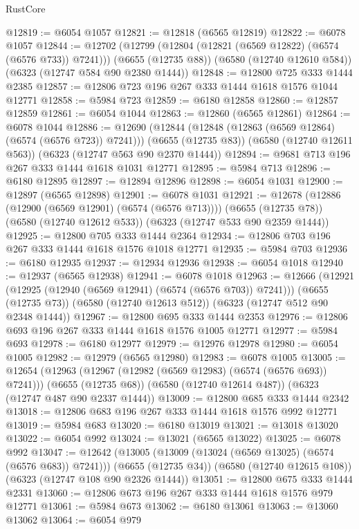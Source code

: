 \begin{lexlean}{RustCore}
\begin{coremodule}
{\begin{coremodule}
{{{{{{{{{{{{{{{{{{{{{{{{{{{{{{{{{{{{{{{{{{{{{@12819 := @6054 @1057
@12821 := @12818 (@6565 @12819)
@12822 := @6078 @1057
@12844 := @12702
    (@12799 (@12804 (@12821 (@6569 @12822) (@6574 (@6576 @733)) @7241)))
    (@6655 (@12735 @88))
    (@6580 (@12740 @12610 @584))
    (@6323 (@12747 @584 @90 @2380 @1444))
@12848 := @12800 @725 @333 @1444 @2385
@12857 := @12806 @723 @196 @267 @333 @1444 @1618 @1576 @1044 @12771
@12858 := @5984 @723
@12859 := @6180 @12858
@12860 := @12857 @12859
@12861 := @6054 @1044
@12863 := @12860 (@6565 @12861)
@12864 := @6078 @1044
@12886 := @12690
    (@12844 (@12848 (@12863 (@6569 @12864) (@6574 (@6576 @723)) @7241)))
    (@6655 (@12735 @83))
    (@6580 (@12740 @12611 @563))
    (@6323 (@12747 @563 @90 @2370 @1444))
@12894 := @9681 @713 @196 @267 @333 @1444 @1618 @1031 @12771
@12895 := @5984 @713
@12896 := @6180 @12895
@12897 := @12894 @12896
@12898 := @6054 @1031
@12900 := @12897 (@6565 @12898)
@12901 := @6078 @1031
@12921 := @12678
    (@12886 (@12900 (@6569 @12901) (@6574 (@6576 @713))))
    (@6655 (@12735 @78))
    (@6580 (@12740 @12612 @533))
    (@6323 (@12747 @533 @90 @2359 @1444))
@12925 := @12800 @705 @333 @1444 @2364
@12934 := @12806 @703 @196 @267 @333 @1444 @1618 @1576 @1018 @12771
@12935 := @5984 @703
@12936 := @6180 @12935
@12937 := @12934 @12936
@12938 := @6054 @1018
@12940 := @12937 (@6565 @12938)
@12941 := @6078 @1018
@12963 := @12666
    (@12921 (@12925 (@12940 (@6569 @12941) (@6574 (@6576 @703)) @7241)))
    (@6655 (@12735 @73))
    (@6580 (@12740 @12613 @512))
    (@6323 (@12747 @512 @90 @2348 @1444))
@12967 := @12800 @695 @333 @1444 @2353
@12976 := @12806 @693 @196 @267 @333 @1444 @1618 @1576 @1005 @12771
@12977 := @5984 @693
@12978 := @6180 @12977
@12979 := @12976 @12978
@12980 := @6054 @1005
@12982 := @12979 (@6565 @12980)
@12983 := @6078 @1005
@13005 := @12654
    (@12963 (@12967 (@12982 (@6569 @12983) (@6574 (@6576 @693)) @7241)))
    (@6655 (@12735 @68))
    (@6580 (@12740 @12614 @487))
    (@6323 (@12747 @487 @90 @2337 @1444))
@13009 := @12800 @685 @333 @1444 @2342
@13018 := @12806 @683 @196 @267 @333 @1444 @1618 @1576 @992 @12771
@13019 := @5984 @683
@13020 := @6180 @13019
@13021 := @13018 @13020
@13022 := @6054 @992
@13024 := @13021 (@6565 @13022)
@13025 := @6078 @992
@13047 := @12642
    (@13005 (@13009 (@13024 (@6569 @13025) (@6574 (@6576 @683)) @7241)))
    (@6655 (@12735 @34))
    (@6580 (@12740 @12615 @108))
    (@6323 (@12747 @108 @90 @2326 @1444))
@13051 := @12800 @675 @333 @1444 @2331
@13060 := @12806 @673 @196 @267 @333 @1444 @1618 @1576 @979 @12771
@13061 := @5984 @673
@13062 := @6180 @13061
@13063 := @13060 @13062
@13064 := @6054 @979
}}}}}}}}}}}}}}}}}}}}}}}}}}}}}}}}}}}}}}}}}}}}}
\end{coremodule}}
\end{coremodule}
\end{lexlean}
